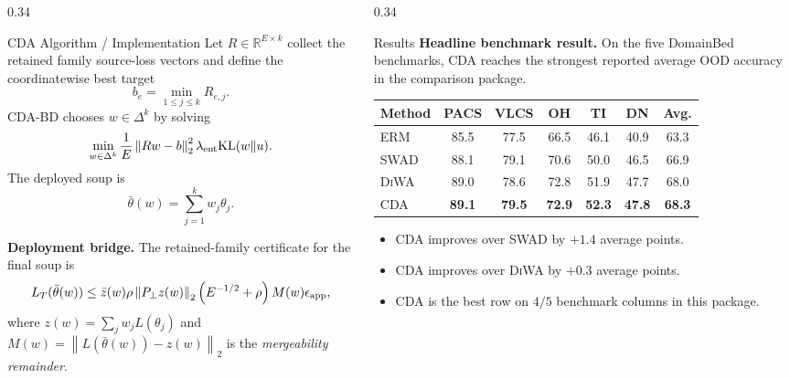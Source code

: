 \documentclass[final]{beamer}
\newcommand{\RR}{\mathbb{R}}
\newcommand{\simplex}{\Delta}
\newcommand{\norm}[1]{\left\lVert #1 \right\rVert}
\newcommand{\paren}[1]{\left( #1 \right)}
\newcommand{\KL}{\mathrm{KL}}
\newcommand{\ood}{\mathrm{OOD}}
\newcommand{\bd}{\textsc{CDA-BD}}
\newcommand{\cda}{\textsc{CDA}}
\newcommand{\swad}{\textsc{SWAD}}
\newcommand{\diwa}{\textsc{DiWA}}
\newcommand{\thetaw}{\bar{\theta}(w)}
\begin{document}
\begin{frame}[t]
\begin{columns}[t,totalwidth=\textwidth]
\begin{column}{0.34\textwidth}
\begin{block}{CDA Algorithm / Implementation}
Let \(R\in\RR^{E\times k}\) collect the retained family source-loss vectors and define the coordinatewise best target
\[
b_e=\min_{1\le j\le k} R_{e,j}.
\]
\bd{} chooses \(w\in\simplex^k\) by solving
\[
\min_{w\in\simplex^k}
\frac{1}{E}\norm{Rw-b}_2^2
\lambda_{\rm ent}\KL(w\|u).
\]
The deployed soup is
\[
\thetaw=\sum_{j=1}^k w_j\theta_j.
\]

\vspace{0.5em}
\textbf{Deployment bridge.} The retained-family certificate for the final soup is
\[
L_T(\thetaw)
\le
\bar z(w)
\rho\norm{P_\perp z(w)}_2
\paren{E^{-1/2}+\rho}M(w)
\epsilon_{\rm app},
\]
where \(z(w)=\sum_j w_jL(\theta_j)\) and \(M(w)=\norm{L(\thetaw)-z(w)}_2\) is the \emph{mergeability remainder}.

\end{block}

\end{column}

\begin{column}{0.34\textwidth}

\begin{block}{Results}
\small
\textbf{Headline benchmark result.} On the five DomainBed benchmarks, \cda{} reaches the strongest reported average \(\ood\) accuracy in the comparison package.

\begin{center}
\renewcommand{\arraystretch}{1.18}
\begin{tabular}{lcccccc}
\toprule
\textbf{Method} & \textbf{PACS} & \textbf{VLCS} & \textbf{OH} & \textbf{TI} & \textbf{DN} & \textbf{Avg.}\\
\midrule
ERM & 85.5 & 77.5 & 66.5 & 46.1 & 40.9 & 63.3\\
\swad{} & 88.1 & 79.1 & 70.6 & 50.0 & 46.5 & 66.9\\
\diwa{} & 89.0 & 78.6 & 72.8 & 51.9 & 47.7 & 68.0\\
\cda{} & \textbf{89.1} & \textbf{79.5} & \textbf{72.9} & \textbf{52.3} & \textbf{47.8} & \textbf{68.3}\\
\bottomrule
\end{tabular}
\end{center}

\vspace{0.4em}
\begin{itemize}
    \item \cda{} improves over \swad{} by \(+1.4\) average points.
    \item \cda{} improves over \diwa{} by \(+0.3\) average points.
    \item \cda{} is the best row on \(4/5\) benchmark columns in this package.
\end{itemize}


\end{block}
\end{column}
\end{columns}
\end{frame}
\end{document}

